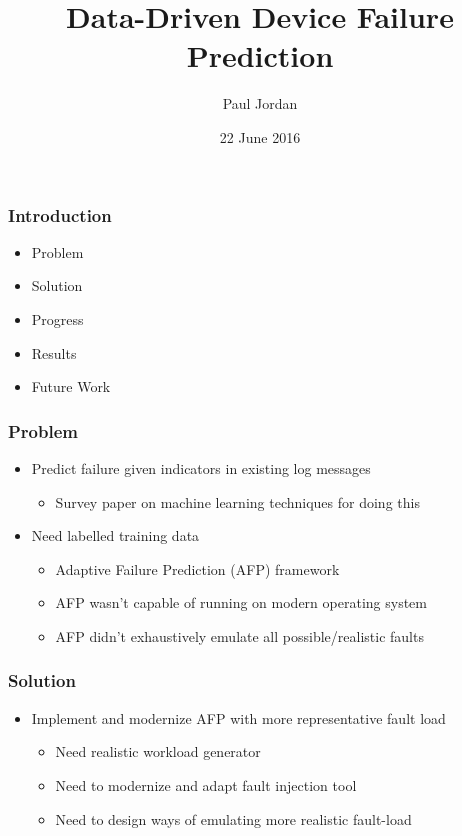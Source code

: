\documentclass[aspectratio=169]{beamer}
\title{Data-Driven Device Failure Prediction}
\author{Paul Jordan}
\institute{Air Force Institute of Technology \\
Center for Cyberspace Research}
\date{22 June 2016}
\begin{document}
 
\frame{\titlepage}
 

\begin{frame}
  \frametitle{Introduction}
  \begin{itemize}
  \item{Problem}
  \item{Solution}
  \item{Progress}
  \item{Results}
  \item{Future Work}
  \end{itemize}
\end{frame}
 

\begin{frame}
  \frametitle{Problem}
  \begin{itemize}
  \item{Predict failure given indicators in existing log messages}
    \begin{itemize}
    \item{Survey paper on machine learning techniques for doing
    this~\cite{salfnerSurvey}}
    \end{itemize}
  \item{Need labelled training data}
    \begin{itemize}
    \item{Adaptive Failure Prediction (AFP) framework~\cite{irrera2015}}
    \item{AFP wasn't capable of running on modern operating system}
    \item{AFP didn't exhaustively emulate all possible/realistic
    faults~\cite{kikuchi2014}}
    \end{itemize}
  \end{itemize}
\end{frame}


\begin{frame}
  \frametitle{Solution}
  \begin{itemize}
  \item{Implement and modernize AFP with more representative fault load}
    \begin{itemize}
    \item{Need realistic workload generator}
    \item{Need to modernize and adapt fault injection tool}
    \item{Need to design ways of emulating more realistic fault-load}
    \end{itemize}
  \end{itemize}
\end{frame}
\end{document}
